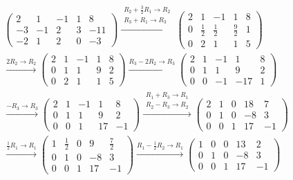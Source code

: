 \documentclass[
  hebrew,
  12pt,
  a4paper,
  oneside]{book}
\theoremstyle{definition}
\theoremstyle{remark}
\theoremstyle{plain}
\theoremstyle{remark}
\begin{document}
\begin{example}
\[\begin{aligned}
&\left(\begin{array}{rrrr|r}
2 & 1 & -1 & 1 & 8 \\
-3 & -1 & 2 & 3 & -11 \\
-2 & 1 & 2 & 0 & -3
\end{array}\right)
\xrightarrow{\substack{R_2 + \tfrac{3}{2} R_1 \to R_2 \\ R_3 + R_1 \to R_3}}
\left(\begin{array}{rrrr|r}
2 & 1 & -1 & 1 & 8 \\
0 & \tfrac{1}{2} & \tfrac{1}{2} & \tfrac{9}{2} & 1 \\
0 & 2 & 1 & 1 & 5
\end{array}\right) \\[6pt]
&\xrightarrow{2 R_2 \to R_2}
\left(\begin{array}{rrrr|r}
2 & 1 & -1 & 1 & 8 \\
0 & 1 & 1 & 9 & 2 \\
0 & 2 & 1 & 1 & 5
\end{array}\right)
\xrightarrow{R_3 - 2 R_2 \to R_3}
\left(\begin{array}{rrrr|r}
2 & 1 & -1 & 1 & 8 \\
0 & 1 & 1 & 9 & 2 \\
0 & 0 & -1 & -17 & 1
\end{array}\right) \\[6pt]
&\xrightarrow{-R_3 \to R_3}
\left(\begin{array}{rrrr|r}
2 & 1 & -1 & 1 & 8 \\
0 & 1 & 1 & 9 & 2 \\
0 & 0 & 1 & 17 & -1
\end{array}\right)
\xrightarrow{\substack{R_1 + R_3 \to R_1 \\ R_2 - R_3 \to R_2}}
\left(\begin{array}{rrrr|r}
2 & 1 & 0 & 18 & 7 \\
0 & 1 & 0 & -8 & 3 \\
0 & 0 & 1 & 17 & -1
\end{array}\right) \\[6pt]
&\xrightarrow{\tfrac{1}{2} R_1 \to R_1}
\left(\begin{array}{rrrr|r}
1 & \tfrac{1}{2} & 0 & 9 & \tfrac{7}{2} \\
0 & 1 & 0 & -8 & 3 \\
0 & 0 & 1 & 17 & -1
\end{array}\right)
\xrightarrow{R_1 - \tfrac{1}{2} R_2 \to R_1}
\left(\begin{array}{rrrr|r}
1 & 0 & 0 & 13 & 2 \\
0 & 1 & 0 & -8 & 3 \\
0 & 0 & 1 & 17 & -1
\end{array}\right)
\end{aligned}\]


\end{example}
\end{document}
